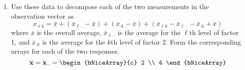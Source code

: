 \begin{enumerate}[label= (\alph*)]
    \item Use these data to decompose each of the two measurements in the observation
    vector as
    \[
        x_{\ell k}
        =
        \bar{x}
        +
        (
            \bar{x}_{\ell \cdot}
            -
            \bar{x}
        )
        +
        (
            \bar{x}_{\cdot k}
            -
            \bar{x}
        )
        +
        (
            \bar{x}_{\ell k}
            -
            \bar{x}_{\ell \cdot}
            -
            \bar{x}_{\cdot k}
            +
            \bar{x}
        )
    \]
    where $\bar{x}$ is the overall average, $\bar{x}_{\ell \cdot}$ is the average for the $\ell$th
    level of factor 1, and $\bar{x}_{\cdot k}$ is the average for the $k$th level of factor 2. Form the corresponding arrays for each of the two responses.
    \[
        \bar{\textbf{x}}
        =
        \bar{\textbf{x}}_{\cdot\cdot}
        =
        \begin{bNiceArray}{c}
            2 \\
            4
        \end{bNiceArray}
    \]
    

\end{enumerate}
